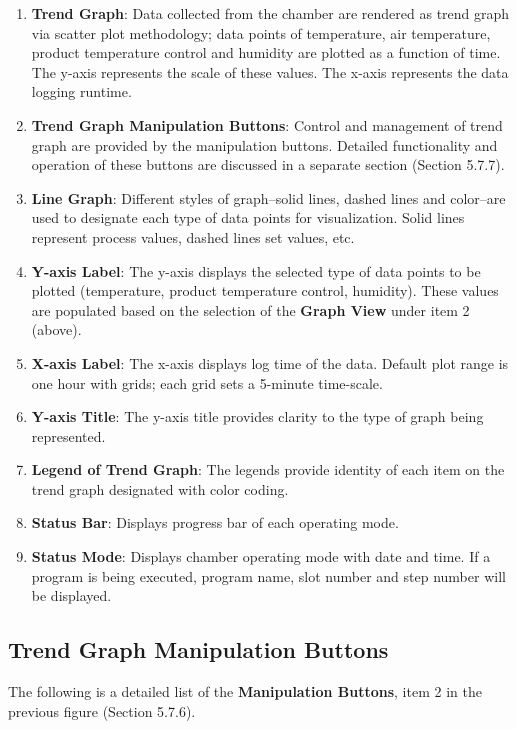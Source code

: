 \begin{enumerate}
\def\labelenumi{\arabic{enumi}.}
\item
  \textbf{Trend Graph}: Data collected from the chamber are rendered as
  trend graph via scatter plot methodology; data points of temperature,
  air temperature, product temperature control and humidity are plotted
  as a function of time. The y-axis represents the scale of these
  values. The x-axis represents the data logging runtime.
\item
  \textbf{Trend Graph Manipulation Buttons}: Control and management of
  trend graph are provided by the manipulation buttons. Detailed
  functionality and operation of these buttons are discussed in a
  separate section (Section 5.7.7).
\item
  \textbf{Line Graph}: Different styles of graph--solid lines, dashed
  lines and color--are used to designate each type of data points for
  visualization. Solid lines represent process values, dashed lines set
  values, etc.
\item
  \textbf{Y-axis Label}: The y-axis displays the selected type of data
  points to be plotted (temperature, product temperature control,
  humidity). These values are populated based on the selection of the
  \textbf{Graph View} under item 2 (above).
\item
  \textbf{X-axis Label}: The x-axis displays log time of the data.
  Default plot range is one hour with grids; each grid sets a 5-minute
  time-scale.
\item
  \textbf{Y-axis Title}: The y-axis title provides clarity to the type
  of graph being represented.
\item
  \textbf{Legend of Trend Graph}: The legends provide identity of each
  item on the trend graph designated with color coding.
\item
  \textbf{Status Bar}: Displays progress bar of each operating mode.
\item
  \textbf{Status Mode}: Displays chamber operating mode with date and
  time. If a program is being executed, program name, slot number and
  step number will be displayed.
\end{enumerate}


\subsection{Trend Graph Manipulation
Buttons}

The following is a detailed list of the \textbf{Manipulation Buttons},
item 2 in the previous figure (Section 5.7.6).

